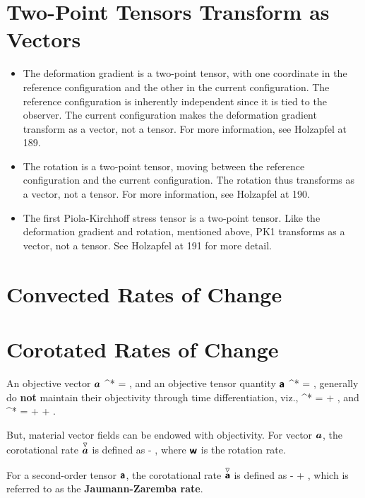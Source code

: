 \section{Two-Point Tensors Transform as Vectors}
\begin{itemize}

\item The deformation gradient is a two-point tensor, 
with one coordinate in the reference configuration
and the other in the current configuration.  
The reference configuration
is inherently independent since it is tied to the observer.  
The current configuration makes the deformation gradient 
transform as a vector, not a tensor.  
For more information, see Holzapfel at 189.

\item The rotation is a two-point tensor, 
moving between the reference configuration and 
the current configuration.
The rotation thus transforms as a vector, not a tensor.  
For more information, see Holzapfel at 190.

\item The first Piola-Kirchhoff
stress tensor is a two-point tensor.  
Like the deformation gradient and
rotation, mentioned above, PK1 transforms 
as a vector, not a tensor.
See Holzapfel at 191 for more detail.

\end{itemize}

\section{Convected Rates of Change}

\section{Corotated Rates of Change}
An objective vector $\mbox{\boldmath $a$}$ 
\be
 \va^* = \tRbold \; \va,
\ee
and an objective tensor quantity $\mbox{\sffamily\bfseries a}$ 
\be
 \tabold^* = \tRbold \; \tabold \; \tRbold\transpose,
\ee
generally do {\bf not} maintain their objectivity through
time differentiation, viz.,
\be
 \dot{\va}^* = \dot{\tRbold} \; \va + \tRbold \; \dot{\va},
\ee
and
\be
 \dot{\tabold}^* = 
 \dot{\tRbold} \; \tabold \; \tRbold\transpose + 
 \tRbold \; \dot{\tabold} \; \tRbold\transpose + 
 \tRbold \; \tabold \; \dot{\tRbold}\transpose.
\ee

But, material vector fields can be endowed with objectivity.
For vector $\mbox{\boldmath $a$}$, the 
corotational rate 
$\overset{\triangledown}{\mbox{\boldmath $a$}}$ is defined as
\be
 \overset{\triangledown}{\va}
  \dot{\va} - \twbold \; \va,
\ee
where $\mbox{\sffamily\bfseries w}$ is the rotation rate.

For a second-order tensor $\mbox{\sffamily\bfseries a}$, the 
corotational rate $\overset{\triangledown}{\mbox{\sffamily\bfseries a}}$ is defined as
\be
 \overset{\triangledown}{\tabold}  \dot{\tabold} - \twbold \; \tabold
 + \tabold \; \twbold,
\ee
which is referred to as the {\bf Jaumann-Zaremba rate}.

